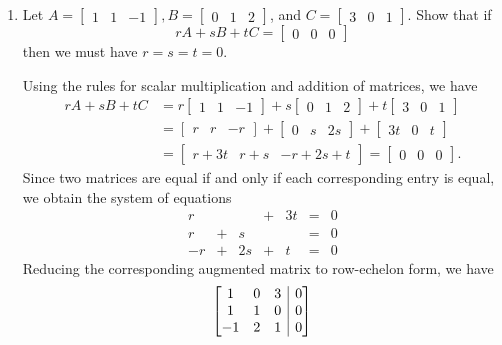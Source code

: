 \documentclass[letterpaper,12pt]{article}
\makeatletter
\newenvironment{amatrix}[1]{%
  \left[\begin{array}{@{}*{#1}{c}|c@{}}
}{%
  \end{array}\right]
}
\makeatother
\begin{document}
\begin{enumerate}
\bigskip

 \item Let $A = \begin{bmatrix} 1 & 1 & -1 \end{bmatrix}, B = \begin{bmatrix}
 0 & 1 & 2
 \end{bmatrix}$, and $C = \begin{bmatrix}
 3 & 0  & 1
 \end{bmatrix}$. Show that if 
 \[
 rA+sB+tC=\begin{bmatrix}
 0 & 0 & 0
 \end{bmatrix}
 \]
 then we must have $r=s=t=0$. 

\bigskip

Using the rules for scalar multiplication and addition of matrices, we have
\begin{align*}
 rA+sB+tC &= r\begin{bmatrix}1&1&-1\end{bmatrix}+s\begin{bmatrix}0&1&2\end{bmatrix}+t\begin{bmatrix}3&0&1\end{bmatrix}\\
& = \begin{bmatrix}r&r&-r\end{bmatrix}+\begin{bmatrix}0&s&2s\end{bmatrix}+\begin{bmatrix}3t&0&t\end{bmatrix}\\
& = \begin{bmatrix}r+3t&r+s&-r+2s+t\end{bmatrix} = \begin{bmatrix}0&0&0\end{bmatrix}.
\end{align*}
Since two matrices are equal if and only if each corresponding entry is equal, we obtain the system of equations
\[
\begin{array}{ccccccc}
 r& & &+&3t&=&0\\
 r&+&s& & &=&0\\
-r&+&2s&+&t&=&0
\end{array}
\]
Reducing the corresponding augmented matrix to row-echelon form, we have
\begin{align*}
 \begin{amatrix}{3}
  1&0&3&0\\1&1&0&0\\-1&2&1&0

\end{amatrix}
\end{align*}
\end{enumerate}
\end{document}
